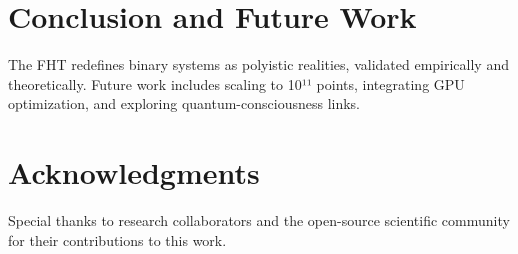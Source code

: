 \documentclass[12pt]{article}
\begin{document}
\section{Conclusion and Future Work}
The FHT redefines binary systems as polyistic realities, validated empirically and theoretically. Future work includes scaling to 10¹¹ points, integrating GPU optimization, and exploring quantum-consciousness links.

\section{Acknowledgments}
Special thanks to research collaborators and the open-source scientific community for their contributions to this work.



\end{document}
